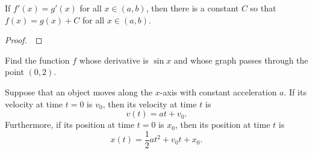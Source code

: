 \begin{corollary}
If $f'(x)=g'(x)$ for all $x\in (a,b)$, then there is a constant $C$ so that $f(x)=g(x)+C$ for all $x\in (a,b)$.
\end{corollary}
\begin{proof}\,

\vspace{3in}
\end{proof}

\newpage

\begin{example}
Find the function $f$ whose derivative is $\sin x$ and whose graph passes through the point $(0,2)$.
\end{example}

\newpage

\begin{theorem} 
Suppose that an object moves along the $x$-axis with constant acceleration $a$.
If its velocity at time $t=0$ is $v_0$, then its velocity at time $t$ is
\begin{equation*}
v(t) = at + v_0.
\end{equation*}
Furthermore, if its position at time $t=0$ is $x_0$, then its position at time $t$ is
\begin{equation*}
x(t) = \frac{1}{2}at^2+v_0t + x_0.
\end{equation*}
\end{theorem}
